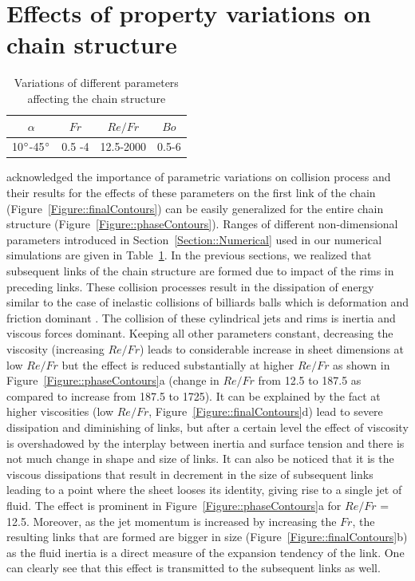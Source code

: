 \documentclass[%
aip,
sd,%
amsmath,amssymb,
preprint,%
author-year,%
]{revtex4-1}
\begin{document}
\section{Effects of property variations on chain structure} \label{Section::ParametricVariations}
\begin{table}[]
	\centering
	\caption{Variations of different parameters affecting the chain structure}
	\label{Table::parameters}
	\begin{tabular}{@{}cccc@{}}
		\hline
		$\alpha$ & $Fr$     & $Re/Fr$     & $Bo$    \\ \hline
		10$\degree$-45$\degree$ & 0.5 -4 & 12.5-2000 & 0.5-6 \\ \hline
	\end{tabular}
\end{table}
\cite{yang2014liquid} acknowledged the importance of parametric variations on collision process and their results for the effects of these parameters on the first link of the chain (Figure~\ref{Figure::finalContours}) can be easily generalized for the entire chain structure (Figure~\ref{Figure::phaseContours}). Ranges of different non-dimensional parameters introduced in Section~\ref{Section::Numerical} used in our numerical simulations are given in Table~\ref{Table::parameters}. In the previous sections, we realized that subsequent links of the chain structure are formed due to impact of the rims in preceding links. These collision processes result in the dissipation of energy similar to the case of inelastic collisions of billiards balls which is deformation and friction dominant \citep{irodov1980fundamental}. The collision of these cylindrical jets and rims is inertia and viscous forces dominant. Keeping all other parameters constant, decreasing the viscosity (increasing $Re/Fr$) leads to considerable increase in sheet dimensions at low $Re/Fr$ but the effect is reduced substantially at higher $Re/Fr$ as shown in Figure~\ref{Figure::phaseContours}a (change in $Re/Fr$ from 12.5 to 187.5 as compared to increase from 187.5 to 1725). It can be explained by the fact at higher viscosities (low $Re/Fr$, Figure~\ref{Figure::finalContours}d) lead to severe dissipation and diminishing of links, but after a certain level the effect of viscosity is overshadowed by the interplay between inertia and surface tension and there is not much change in shape and size of links. It can also be noticed that it is the viscous dissipations that result in decrement in the size of subsequent links leading to a point where the sheet looses its identity, giving rise to a single jet of fluid. The effect is prominent in Figure~\ref{Figure::phaseContours}a for $Re/Fr$ = 12.5. Moreover, as the jet momentum is increased by increasing the $Fr$, the resulting links that are formed are bigger in size (Figure~\ref{Figure::finalContours}b) as the fluid inertia is a direct measure of the expansion tendency of the link. One can clearly see that this effect is transmitted to the subsequent links as well.\\
\end{document}
